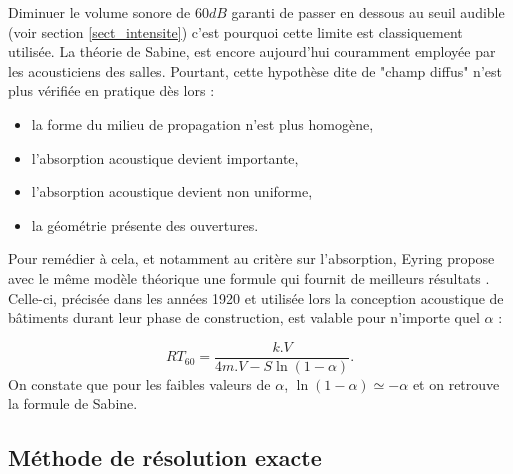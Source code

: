 Diminuer le volume sonore de $60dB$ garanti de passer en dessous au seuil audible (voir section \ref{sect_intensite}) c'est pourquoi cette limite est classiquement utilisée. La théorie de Sabine, est encore aujourd'hui couramment employée par les acousticiens des salles. Pourtant, cette hypothèse dite de "champ diffus" n’est plus vérifiée en pratique dès lors :
\begin{itemize}
\item la forme du milieu de propagation n’est plus homogène,
\item l’absorption acoustique devient importante,
\item l’absorption acoustique devient non uniforme,
\item la géométrie présente des ouvertures.
\end{itemize}
Pour remédier à cela, et notamment au critère sur l'absorption, Eyring propose avec le même modèle théorique une formule qui fournit de meilleurs résultats \cite[p. 217-241]{eyring}. Celle-ci, précisée dans les années 1920 et utilisée lors la conception acoustique de bâtiments durant leur phase de construction, est valable pour n'importe quel $\alpha$ :

\begin{equation}
   	RT_{60} = \frac{k.V}{4m.V - S\ln{(1-\alpha)}}.
\end{equation}
%
On constate que pour les faibles valeurs de $\alpha$, $\ln{(1-\alpha)} \simeq -\alpha$ et on retrouve la formule de Sabine.
 
	\subsection{Méthode de résolution exacte} \label{sect_resExacte}

